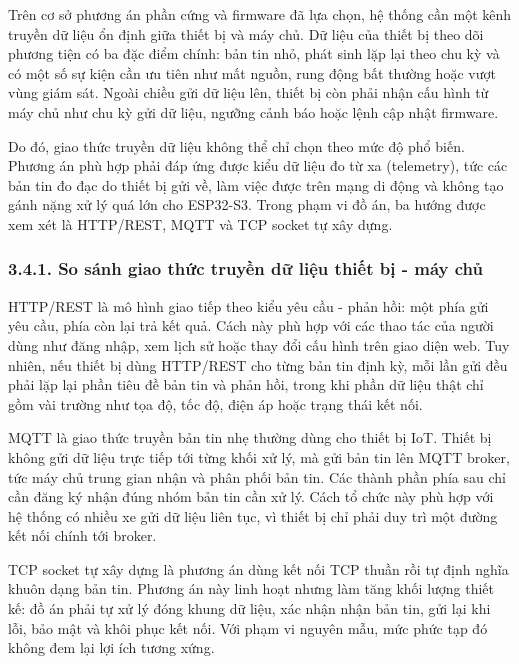 \documentclass[a4paper]{extarticle}
\begin{document}
Trên cơ sở phương án phần cứng và firmware đã lựa chọn, hệ thống cần một kênh truyền dữ liệu ổn định giữa thiết bị và máy chủ. Dữ liệu của thiết bị theo dõi phương tiện có ba đặc điểm chính: bản tin nhỏ, phát sinh lặp lại theo chu kỳ và có một số sự kiện cần ưu tiên như mất nguồn, rung động bất thường hoặc vượt vùng giám sát. Ngoài chiều gửi dữ liệu lên, thiết bị còn phải nhận cấu hình từ máy chủ như chu kỳ gửi dữ liệu, ngưỡng cảnh báo hoặc lệnh cập nhật firmware.

Do đó, giao thức truyền dữ liệu không thể chỉ chọn theo mức độ phổ biến. Phương án phù hợp phải đáp ứng được kiểu dữ liệu đo từ xa (telemetry), tức các bản tin đo đạc do thiết bị gửi về, làm việc được trên mạng di động và không tạo gánh nặng xử lý quá lớn cho ESP32-S3. Trong phạm vi đồ án, ba hướng được xem xét là HTTP/REST, MQTT và TCP socket tự xây dựng.

\subsubsection{3.4.1. So sánh giao thức truyền dữ liệu thiết bị - máy chủ}\label{so-suxe1nh-giao-thux1ee9c-truyux1ec1n-dux1eef-liux1ec7u-thiux1ebft-bux1ecb---muxe1y-chux1ee7}

HTTP/REST là mô hình giao tiếp theo kiểu yêu cầu - phản hồi: một phía gửi yêu cầu, phía còn lại trả kết quả. Cách này phù hợp với các thao tác của người dùng như đăng nhập, xem lịch sử hoặc thay đổi cấu hình trên giao diện web. Tuy nhiên, nếu thiết bị dùng HTTP/REST cho từng bản tin định kỳ, mỗi lần gửi đều phải lặp lại phần tiêu đề bản tin và phản hồi, trong khi phần dữ liệu thật chỉ gồm vài trường như tọa độ, tốc độ, điện áp hoặc trạng thái kết nối.

MQTT là giao thức truyền bản tin nhẹ thường dùng cho thiết bị IoT. Thiết bị không gửi dữ liệu trực tiếp tới từng khối xử lý, mà gửi bản tin lên MQTT broker, tức máy chủ trung gian nhận và phân phối bản tin. Các thành phần phía sau chỉ cần đăng ký nhận đúng nhóm bản tin cần xử lý. Cách tổ chức này phù hợp với hệ thống có nhiều xe gửi dữ liệu liên tục, vì thiết bị chỉ phải duy trì một đường kết nối chính tới broker.

TCP socket tự xây dựng là phương án dùng kết nối TCP thuần rồi tự định nghĩa khuôn dạng bản tin. Phương án này linh hoạt nhưng làm tăng khối lượng thiết kế: đồ án phải tự xử lý đóng khung dữ liệu, xác nhận nhận bản tin, gửi lại khi lỗi, bảo mật và khôi phục kết nối. Với phạm vi nguyên mẫu, mức phức tạp đó không đem lại lợi ích tương xứng.
\end{document}
